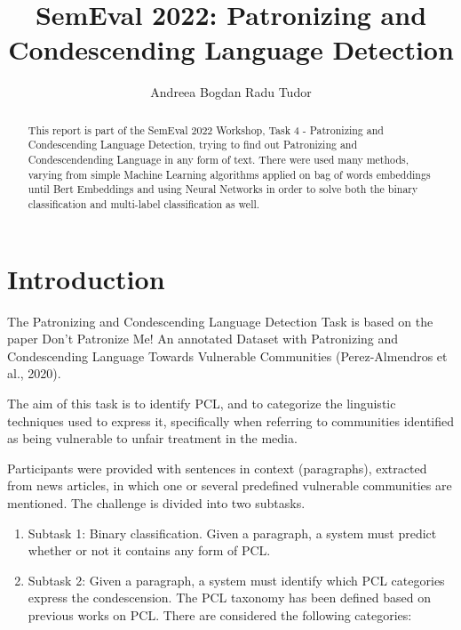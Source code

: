 \documentclass[11pt]{article}
\begin{document}
\title{SemEval 2022: Patronizing and Condescending Language Detection}
\author{Andreea \And Bogdan \And Radu \And Tudor
    }
\date{}
\maketitle

\begin{abstract}
This report is part of the SemEval 2022 Workshop, Task 4 - Patronizing and
Condescending Language Detection, trying to find out Patronizing and
Condescendending Language in any form of text. There were used many methods,
varying from simple Machine Learning algorithms applied on bag of words
embeddings until Bert Embeddings and using Neural Networks in order to solve
both the binary classification and multi-label classification as well.
\end{abstract}

\section{Introduction}

The Patronizing and Condescending Language Detection Task is based on the
paper Don't Patronize Me! An annotated Dataset with Patronizing and
Condescending Language Towards Vulnerable Communities (Perez-Almendros et
al., 2020).

The aim of this task is to identify PCL, and to categorize the linguistic
techniques used to express it, specifically when referring to communities
identified as being vulnerable to unfair treatment in the media.

Participants were provided with sentences in context (paragraphs), extracted
from news articles, in which one or several predefined vulnerable
communities are mentioned. The challenge is divided into two subtasks.

\begin{enumerate}
\item Subtask 1: Binary classification. Given a paragraph, a system must
predict whether or not it contains any form of PCL.

\item Subtask 2: Given a paragraph, a system must identify which PCL
categories express the condescension. The PCL taxonomy has been defined
based on previous works on PCL. There are considered the following
categories:
\end{enumerate}
\end{document}
